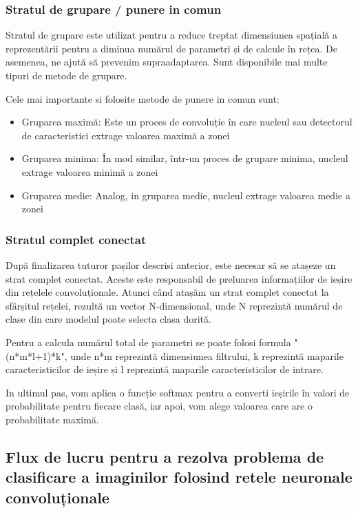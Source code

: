 \documentclass[10pt]{article}
\begin{document}
\subsubsection{Stratul de grupare / punere in comun}

\> Stratul de grupare este utilizat pentru a reduce treptat dimensiunea spațială a reprezentării pentru a diminua numărul de parametri și de calcule în rețea.
De asemenea, ne ajută să prevenim supraadaptarea. Sunt disponibile mai multe tipuri de metode de grupare.

\> Cele mai importante si folosite metode de punere in comun sunt:

\begin{itemize}
\item Gruparea maximă: Este un proces de convoluție în care nucleul sau detectorul de caracteristici extrage valoarea maximă a zonei
\item Gruparea minima: În mod similar, într-un proces de grupare minima, nucleul extrage valoarea minimă a zonei
\item Gruparea medie: Analog, in gruparea medie, nucleul extrage valoarea medie a zonei
\end{itemize}

\subsubsection{Stratul complet conectat}

\> După finalizarea tuturor pașilor descrisi anterior, este necesar să se atașeze un strat complet conectat. Aceste este responsabil de preluarea informațiilor de ieșire din rețelele convoluționale.
Atunci când atașăm un strat complet conectat la sfârșitul rețelei, rezultă un vector N-dimensional, unde N reprezintă numărul de clase din care modelul poate selecta clasa dorită.

\> Pentru a calcula numărul total de parametri se poate folosi formula "(n*m*l+1)*k", unde n*m reprezintă dimensiunea filtrului, k reprezintă maparile caracteristicilor de ieșire și l reprezintă maparile caracteristicilor de intrare.

\> In ultimul pas, vom aplica o funcție softmax pentru a converti ieșirile în valori de probabilitate pentru fiecare clasă, iar apoi, vom alege valoarea care are o probabilitate maximă.

\newpage

\subsection{Flux de lucru pentru a rezolva problema de clasificare a imaginilor folosind retele neuronale convoluționale}
\end{document}
